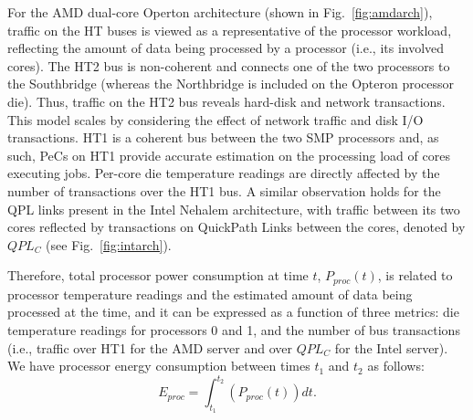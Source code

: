 \documentclass[acmtaco]{acmtrans2m}
\newcommand{\figurename}{Fig.}
\begin{document}
For the AMD dual-core Operton architecture (shown in
\figurename~\ref{fig:amdarch}), traffic on the HT buses is viewed as a
representative of the processor workload, reflecting the amount of data
being processed by a processor (i.e., its involved cores).  The HT2 bus
is non-coherent and connects one of the two processors to the
Southbridge (whereas the Northbridge is included on the Opteron
processor die).  Thus, traffic on the HT2 bus reveals hard-disk and
network transactions.  This model scales by considering the effect of
network traffic and disk I/O transactions.  HT1 is a coherent bus
between the two SMP processors and, as such, PeCs on HT1 provide
accurate estimation on the processing load of cores executing jobs.
Per-core die temperature readings are directly affected by the number of
transactions over the HT1 bus.  A similar observation holds for the QPL
links present in the Intel Nehalem architecture, with traffic between
its two cores reflected by transactions on QuickPath Links between the
cores, denoted by $QPL_C$ (see \figurename~\ref{fig:intarch}).

Therefore, total processor power consumption at time $t$, $P_{proc}(t)$,
is related to processor temperature readings and the estimated amount of
data being processed at the time, and it can be expressed as a function
of three metrics: die temperature readings for processors 0 and 1, and
the number of bus transactions (i.e., traffic over HT1 for the AMD
server and over $QPL_C$ for the Intel server).  We have processor energy
consumption between times $t_{1}$ and $t_{2}$ as follows:
\begin{equation}
  \label{eq:procpwr2}
  E_{proc}=\displaystyle\int_{t_{1}}^{t_{2}}\left( {P_{proc}(t)} \right)dt.
\end{equation}
\end{document}

